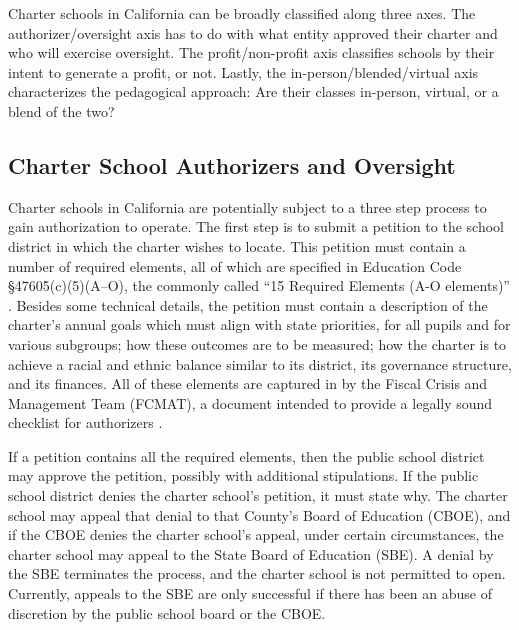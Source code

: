 Charter schools in California can be broadly classified along three axes. The authorizer/oversight axis has to do with what entity approved their charter and who will exercise oversight. The profit/non-profit axis classifies schools by their intent to generate a profit, or not. Lastly, the in-person/blended/virtual axis characterizes the pedagogical approach: Are their classes in-person, virtual, or a blend of the two?

\subsection{Charter School Authorizers and Oversight}\indent

Charter schools in California are potentially subject to a three step process to gain authorization to operate. The first step is to submit a petition to the school district in which the charter wishes to locate. This petition must contain a number of required elements, all of which are specified in Education Code §47605(c)(5)(A–O), the commonly called ``15 Required Elements (A-O elements)'' \parencite[89]{Aguinaldo.etal2021}. Besides some technical details, the petition must contain a description of the charter's annual goals which must align with state priorities, for all pupils and for various subgroups; how these outcomes are to be measured; how the charter is to achieve a racial and ethnic balance similar to its district, its governance structure, and its finances. All of these elements are captured in \textit{} by the Fiscal Crisis and Management Team (FCMAT), a document intended to provide a legally sound checklist for authorizers \parencite{FCMAT2022}.  %

If a petition contains all the required elements, then the public school district may approve the petition, possibly with additional stipulations. If the public school district denies the charter school's petition, it must state why. The charter school may appeal that denial to that County's Board of Education (CBOE), and if the CBOE denies the charter school's appeal, under certain circumstances, the charter school may appeal to the State Board of Education (SBE). A denial by the SBE terminates the process, and the charter school is not permitted to open. Currently, appeals to the SBE are only successful if there has been an abuse of discretion by the public school board or the CBOE.

